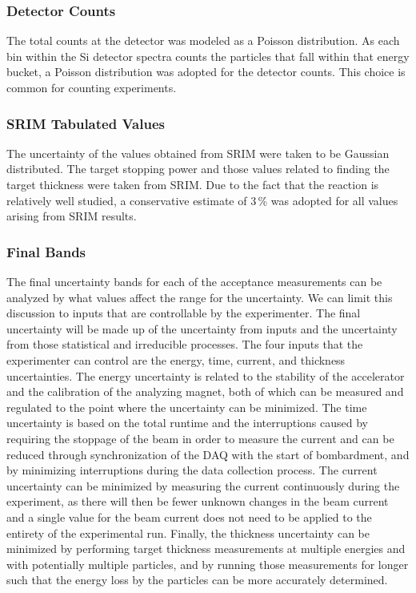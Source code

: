 \subsubsection{Detector Counts}
The total counts at the detector was modeled as a Poisson distribution.
As each bin within the Si detector spectra counts the particles that
fall within that energy bucket, a Poisson distribution was adopted for
the detector counts. This choice is common for counting experiments.

\subsubsection{SRIM Tabulated Values}
The uncertainty of the values obtained from SRIM were taken to be
Gaussian distributed. The target stopping power and those values related
to finding the target thickness were taken from SRIM. Due to the fact
that the \alpa{} reaction is relatively well studied, a conservative
estimate of 3\,\% was adopted for all values arising from SRIM results.

\subsubsection{Final Bands}
The final uncertainty bands for each of the acceptance measurements can
be analyzed by what values affect the range for the uncertainty. We can
limit this discussion to inputs that are controllable by the
experimenter. The final uncertainty will be made up of the uncertainty
from inputs and the uncertainty from those statistical and irreducible
processes. The four inputs that the experimenter can control are the
energy, time, current, and thickness uncertainties. The energy
uncertainty is related to the stability of the accelerator and the
calibration of the analyzing magnet, both of which can be measured and
regulated to the point where the uncertainty can be minimized. The time
uncertainty is based on the total runtime and the interruptions caused
by requiring the stoppage of the beam in order to measure the current
and can be reduced through synchronization of the DAQ with the start of
bombardment, and by minimizing interruptions during the data collection
process. The current uncertainty can be minimized by measuring the
current continuously during the experiment, as there will then be fewer
unknown changes in the beam current and a single value for the beam
current does not need to be applied to the entirety of the experimental
run. Finally, the thickness uncertainty can be minimized by performing
target thickness measurements at multiple energies and with potentially
multiple particles, and by running those measurements for longer such
that the energy loss by the particles can be more accurately determined.

